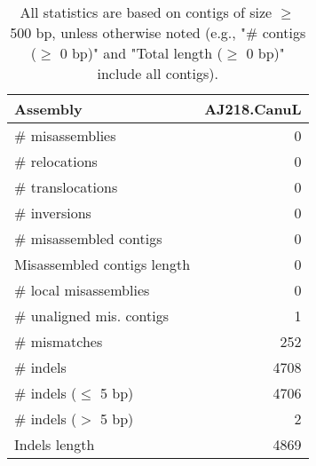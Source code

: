 \documentclass[12pt,a4paper]{article}
\begin{document}
\begin{table}[ht]
\begin{center}
\caption{All statistics are based on contigs of size $\geq$ 500 bp, unless otherwise noted (e.g., "\# contigs ($\geq$ 0 bp)" and "Total length ($\geq$ 0 bp)" include all contigs).}
\begin{tabular}{|l*{1}{|r}|}
\hline
Assembly & AJ218.CanuL \\ \hline
\# misassemblies & 0 \\ \hline
\hspace{5mm}\# relocations & 0 \\ \hline
\hspace{5mm}\# translocations & 0 \\ \hline
\hspace{5mm}\# inversions & 0 \\ \hline
\# misassembled contigs & 0 \\ \hline
Misassembled contigs length & 0 \\ \hline
\# local misassemblies & 0 \\ \hline
\# unaligned mis. contigs & 1 \\ \hline
\# mismatches & 252 \\ \hline
\# indels & 4708 \\ \hline
\hspace{5mm}\# indels ($\leq$ 5 bp) & 4706 \\ \hline
\hspace{5mm}\# indels ($>$ 5 bp) & 2 \\ \hline
Indels length & 4869 \\ \hline
\end{tabular}
\end{center}
\end{table}
\end{document}
